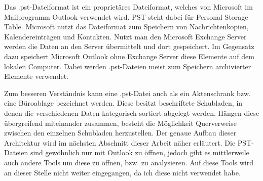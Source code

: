 \noindent Das .pst-Dateiformat ist ein proprietäres Dateiformat, welches von Microsoft im Mailprogramm \glqq{}Outlook\grqq{} verwendet wird. PST steht dabei für Personal Storage Table. Microsoft nutzt das Dateiformat zum Speichern von Nachrichtenkopien, Kalendereinträgen und Kontakten. Nutzt man den Microsoft Exchange Server werden die Daten an den Server übermittelt und dort gespeichert. Im Gegensatz dazu speichert Microsoft Outlook ohne Exchange Server diese Elemente auf dem lokalen Computer. Dabei werden .pst-Dateien meist zum Speichern archivierter Elemente verwendet. \smallskip

\noindent Zum besseren Verständnis kann eine .pst-Datei auch als ein \glqq{}Aktenschrank\grqq{} bzw. eine \glqq{}Büroablage\grqq{} bezeichnet werden. Diese besitzt beschriftete Schubladen, in denen die verschiedenen Daten kategorisch sortiert abgelegt werden. Hängen diese übergreifend miteinander zusammen, besteht die Möglichkeit Querverweise zwischen den einzelnen Schubladen herzustellen. Der genaue Aufbau dieser Architektur wird im nächsten Abschnitt dieser Arbeit näher erläutert. Die PST-Dateien sind gewöhnlich nur mit Outlook zu öffnen, jedoch gibt es mittlerweile auch andere Tools um diese zu öffnen, bzw. zu analysieren. Auf diese Tools wird an dieser Stelle nicht weiter eingegangen, da ich diese nicht verwendet habe.